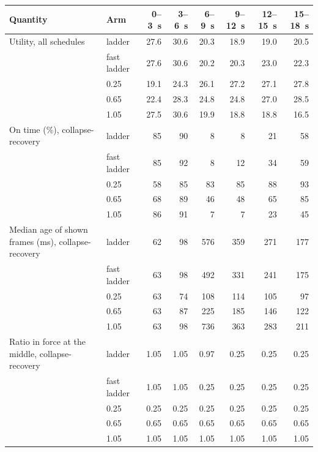 \begin{tabular}{llrrrrrr}
\toprule
Quantity & Arm & 0--3~s & 3--6~s & 6--9~s & 9--12~s & 12--15~s & 15--18~s \\
\midrule
Utility, all schedules & ladder & 27.6 & 30.6 & 20.3 & 18.9 & 19.0 & 20.5 \\
 & fast ladder & 27.6 & 30.6 & 20.2 & 20.3 & 23.0 & 22.3 \\
 & 0.25 & 19.1 & 24.3 & 26.1 & 27.2 & 27.1 & 27.8 \\
 & 0.65 & 22.4 & 28.3 & 24.8 & 24.8 & 27.0 & 28.5 \\
 & 1.05 & 27.5 & 30.6 & 19.9 & 18.8 & 18.8 & 16.5 \\
\midrule
On time (\%), collapse-recovery & ladder & 85 & 90 & 8 & 8 & 21 & 58 \\
 & fast ladder & 85 & 92 & 8 & 12 & 34 & 59 \\
 & 0.25 & 58 & 85 & 83 & 85 & 88 & 93 \\
 & 0.65 & 68 & 89 & 46 & 48 & 65 & 85 \\
 & 1.05 & 86 & 91 & 7 & 7 & 23 & 45 \\
\midrule
Median age of shown frames (ms), collapse-recovery & ladder & 62 & 98 & 576 & 359 & 271 & 177 \\
 & fast ladder & 63 & 98 & 492 & 331 & 241 & 175 \\
 & 0.25 & 63 & 74 & 108 & 114 & 105 & 97 \\
 & 0.65 & 63 & 87 & 225 & 185 & 146 & 122 \\
 & 1.05 & 63 & 98 & 736 & 363 & 283 & 211 \\
\midrule
Ratio in force at the middle, collapse-recovery & ladder & 1.05 & 1.05 & 0.97 & 0.25 & 0.25 & 0.25 \\
 & fast ladder & 1.05 & 1.05 & 0.25 & 0.25 & 0.25 & 0.25 \\
 & 0.25 & 0.25 & 0.25 & 0.25 & 0.25 & 0.25 & 0.25 \\
 & 0.65 & 0.65 & 0.65 & 0.65 & 0.65 & 0.65 & 0.65 \\
 & 1.05 & 1.05 & 1.05 & 1.05 & 1.05 & 1.05 & 1.05 \\
\bottomrule
\end{tabular}
